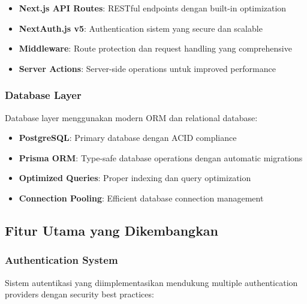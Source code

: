 \begin{itemize}
\item \textbf{Next.js API Routes}: RESTful endpoints dengan built-in optimization
\item \textbf{NextAuth.js v5}: Authentication sistem yang secure dan scalable
\item \textbf{Middleware}: Route protection dan request handling yang comprehensive
\item \textbf{Server Actions}: Server-side operations untuk improved performance
\end{itemize}

\subsubsection{Database Layer}

Database layer menggunakan modern ORM dan relational database:

\begin{itemize}
\item \textbf{PostgreSQL}: Primary database dengan ACID compliance
\item \textbf{Prisma ORM}: Type-safe database operations dengan automatic migrations
\item \textbf{Optimized Queries}: Proper indexing dan query optimization
\item \textbf{Connection Pooling}: Efficient database connection management
\end{itemize}

\subsection{Fitur Utama yang Dikembangkan}

\subsubsection{Authentication System}

Sistem autentikasi yang diimplementasikan mendukung multiple authentication providers dengan security best practices:

